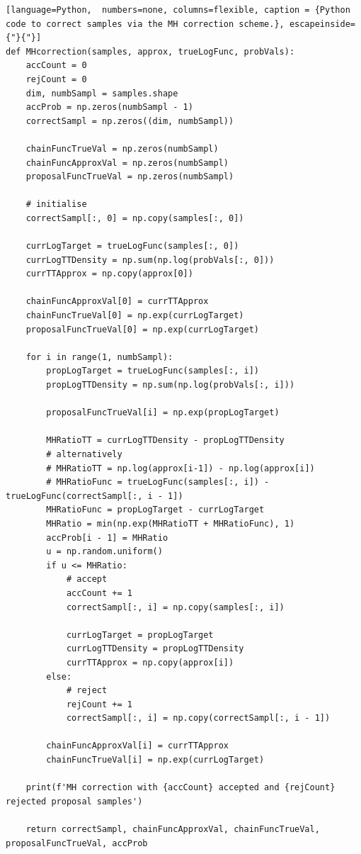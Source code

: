 \begin{lstlisting}[language=Python,	 numbers=none, columns=flexible, caption = {Python code to correct samples via the MH correction scheme.}, escapeinside={"}{"}]
def MHcorrection(samples, approx, trueLogFunc, probVals):
	accCount = 0
	rejCount = 0
	dim, numbSampl = samples.shape
	accProb = np.zeros(numbSampl - 1)
	correctSampl = np.zeros((dim, numbSampl))
	
	chainFuncTrueVal = np.zeros(numbSampl)
	chainFuncApproxVal = np.zeros(numbSampl)
	proposalFuncTrueVal = np.zeros(numbSampl)
	
	# initialise
	correctSampl[:, 0] = np.copy(samples[:, 0])
	
	currLogTarget = trueLogFunc(samples[:, 0])
	currLogTTDensity = np.sum(np.log(probVals[:, 0]))
	currTTApprox = np.copy(approx[0])
	
	chainFuncApproxVal[0] = currTTApprox
	chainFuncTrueVal[0] = np.exp(currLogTarget)
	proposalFuncTrueVal[0] = np.exp(currLogTarget)
	
	for i in range(1, numbSampl):
		propLogTarget = trueLogFunc(samples[:, i])
		propLogTTDensity = np.sum(np.log(probVals[:, i]))
		
		proposalFuncTrueVal[i] = np.exp(propLogTarget)
		
		MHRatioTT = currLogTTDensity - propLogTTDensity
		# alternatively
		# MHRatioTT = np.log(approx[i-1]) - np.log(approx[i])
		# MHRatioFunc = trueLogFunc(samples[:, i]) - trueLogFunc(correctSampl[:, i - 1])
		MHRatioFunc = propLogTarget - currLogTarget
		MHRatio = min(np.exp(MHRatioTT + MHRatioFunc), 1)
		accProb[i - 1] = MHRatio
		u = np.random.uniform()
		if u <= MHRatio:
			# accept
			accCount += 1
			correctSampl[:, i] = np.copy(samples[:, i])
			
			currLogTarget = propLogTarget
			currLogTTDensity = propLogTTDensity
			currTTApprox = np.copy(approx[i])
		else:
			# reject
			rejCount += 1
			correctSampl[:, i] = np.copy(correctSampl[:, i - 1])
		
		chainFuncApproxVal[i] = currTTApprox
		chainFuncTrueVal[i] = np.exp(currLogTarget)
	
	print(f'MH correction with {accCount} accepted and {rejCount} rejected proposal samples')
	
	return correctSampl, chainFuncApproxVal, chainFuncTrueVal, proposalFuncTrueVal, accProb

\end{lstlisting}
\clearpage
